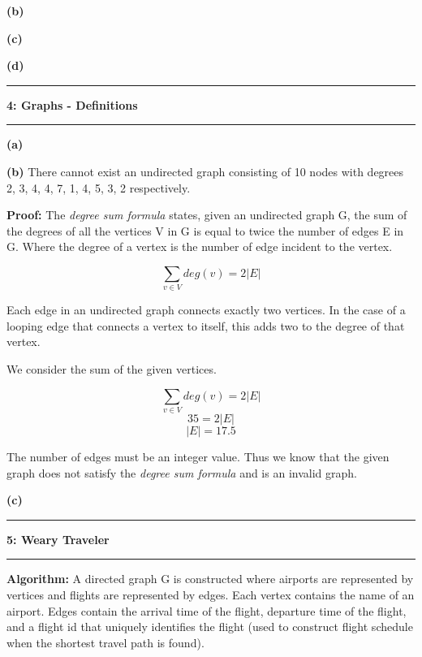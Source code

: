 \documentclass[11pt]{article}
\newcommand\question[2]{\vspace{.25in}\hrule\textbf{#1: #2}\vspace{.5em}\hrule\vspace{.10in}}
\renewcommand\part[1]{\vspace{.10in}\textbf{(#1)}}
\newcommand\algorith{\vspace{.10in}\textbf{Algorithm: }}
\begin{document}
\part{b}

\part{c}

\part{d}

\question{4}{Graphs - Definitions}

\part{a} 

\part{b} There cannot exist an undirected graph consisting of 10 nodes with degrees 2, 3, 4, 4, 7, 1, 4, 5, 3, 2 respectively.

\textbf{Proof:} The \textit{degree sum formula} states, given an undirected graph G, the sum of the degrees of all the vertices V in G is equal to twice the number of edges E in G. Where the degree of a vertex is the number of edge incident to the vertex.

$$\sum_{v \in V} deg(v) = 2|E|$$

Each edge in an undirected graph connects exactly two vertices. In the case of a looping edge that connects a vertex to itself, this adds two to the degree of that vertex.

We consider the sum of the given vertices.

$$\sum_{v \in V} deg(v) = 2|E|$$
$$35 = 2|E|$$
$$|E| = 17.5$$

The number of edges must be an integer value. Thus we know that the given graph does not satisfy the \textit{degree sum formula} and is an invalid graph.

\part{c}

\question{5}{Weary Traveler}

\algorith A directed graph G is constructed where airports are represented by vertices and flights are represented by edges. Each vertex contains the name of an airport. Edges contain the arrival time of the flight, departure time of the flight, and a flight id that uniquely identifies the flight (used to construct flight schedule when the shortest travel path is found).
\end{document}
